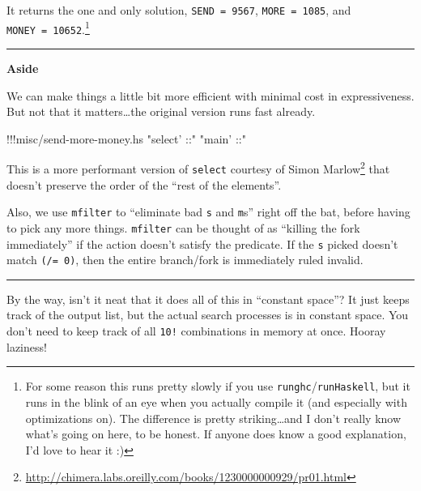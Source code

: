 \documentclass[]{article}
\newenvironment{Shaded}{}{}
\newcommand{\StringTok}[1]{\textcolor[rgb]{0.25,0.44,0.63}{{#1}}}
\newcommand{\FunctionTok}[1]{\textcolor[rgb]{0.02,0.16,0.49}{{#1}}}
\newcommand{\NormalTok}[1]{{#1}}
\renewcommand{\href}[2]{#2\footnote{\url{#1}}}
\begin{document}
It returns the one and only solution, \texttt{SEND\ =\ 9567},
\texttt{MORE\ =\ 1085}, and \texttt{MONEY\ =\ 10652}.\footnote{For some
  reason this runs pretty slowly if you use
  \texttt{runghc}/\texttt{runHaskell}, but it runs in the blink of an
  eye when you actually compile it (and especially with optimizations
  on). The difference is pretty striking\ldots{}and I don't really know
  what's going on here, to be honest. If anyone does know a good
  explanation, I'd love to hear it :)}

\begin{center}\rule{0.5\linewidth}{\linethickness}\end{center}

\textbf{Aside}

We can make things a little bit more efficient with minimal cost in
expressiveness. But not that it matters\ldots{}the original version runs
fast already.

\begin{Shaded}
\begin{Highlighting}[]
\FunctionTok{!!!}\NormalTok{misc}\FunctionTok{/}\NormalTok{send}\FunctionTok{-}\NormalTok{more}\FunctionTok{-}\NormalTok{money}\FunctionTok{.}\NormalTok{hs }\StringTok{"select' ::"} \StringTok{"main' ::"}
\end{Highlighting}
\end{Shaded}

This is a more performant version of \texttt{select}
\href{http://chimera.labs.oreilly.com/books/1230000000929/pr01.html}{courtesy
of Simon Marlow} that doesn't preserve the order of the ``rest of the
elements''.

Also, we use \texttt{mfilter} to ``eliminate bad \texttt{s} and
\texttt{m}s'' right off the bat, before having to pick any more things.
\texttt{mfilter} can be thought of as ``killing the fork immediately''
if the action doesn't satisfy the predicate. If the \texttt{s} picked
doesn't match \texttt{(/=\ 0)}, then the entire branch/fork is
immediately ruled invalid.

\begin{center}\rule{0.5\linewidth}{\linethickness}\end{center}

By the way, isn't it neat that it does all of this in ``constant
space''? It just keeps track of the output list, but the actual search
processes is in constant space. You don't need to keep track of all
\texttt{10!} combinations in memory at once. Hooray laziness!
\end{document}
